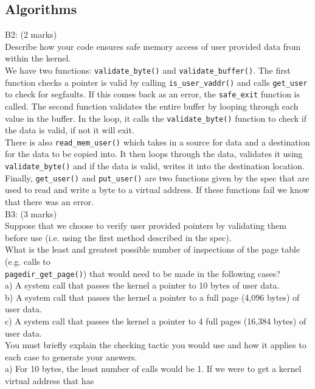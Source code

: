 \documentclass[11pt, a4paper]{article}
\begin{document}
\subsection{Algorithms}
B2: (2 marks)\\
Describe how your code ensures safe memory access of user provided data from within
the kernel.\bigskip\\
We have two functions: \verb|validate_byte()| and \verb|validate_buffer()|. The first function checks a
pointer is valid by calling \verb|is_user_vaddr()| and calls \verb|get_user| to check for segfaults. If
this comes back as an error, the \verb|safe_exit| function is called. The second function validates
the entire buffer by looping through each value in the buffer. In the loop, it calls the \verb|validate_byte()|
function to check if the data is valid, if not it will exit. \\
There is also \verb|read_mem_user()| which takes in a source for data and a destination for the data to be
copied into. It then loops through the data, validates it using \verb|validate_byte()| and if the data
is valid, writes it into the destination location. \\
Finally, \verb|get_user()| and \verb|put_user()| are two functions given by the spec that are used
to read and write a byte to a virtual address. If these functions fail we know that there was an error.\bigskip\\
B3: (3 marks)\\
Suppose that we choose to verify user provided pointers by validating them before use
(i.e. using the first method described in the spec).\\
What is the least and greatest possible number of inspections of the page table (e.g.
calls to\\ \verb|pagedir_get_page()|) that would need to be made in the following cases?\\
a) A system call that passes the kernel a pointer to 10 bytes of user data.\\
b) A system call that passes the kernel a pointer to a full page (4,096 bytes) of user data.\\
c) A system call that passes the kernel a pointer to 4 full pages (16,384 bytes) of
user data.\\
You must briefly explain the checking tactic you would use and how it applies to each case 
to generate your answers.\bigskip\\
a) For 10 bytes, the least number of calls would be 1. If we were to get a kernel virtual address that has
\end{document}
